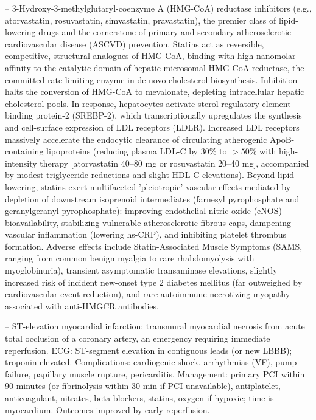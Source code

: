 -- 3-Hydroxy-3-methylglutaryl-coenzyme A (HMG-CoA) reductase inhibitors (e.g., atorvastatin, rosuvastatin, simvastatin, pravastatin), the premier class of lipid-lowering drugs and the cornerstone of primary and secondary atherosclerotic cardiovascular disease (ASCVD) prevention. Statins act as reversible, competitive, structural analogues of HMG-CoA, binding with high nanomolar affinity to the catalytic domain of hepatic microsomal HMG-CoA reductase, the committed rate-limiting enzyme in de novo cholesterol biosynthesis. Inhibition halts the conversion of HMG-CoA to mevalonate, depleting intracellular hepatic cholesterol pools. In response, hepatocytes activate sterol regulatory element-binding protein-2 (SREBP-2), which transcriptionally upregulates the synthesis and cell-surface expression of LDL receptors (LDLR). Increased LDL receptors massively accelerate the endocytic clearance of circulating atherogenic ApoB-containing lipoproteins (reducing plasma LDL-C by 30\% to $>50\%$ with high-intensity therapy [atorvastatin 40--80 mg or rosuvastatin 20--40 mg], accompanied by modest triglyceride reductions and slight HDL-C elevations). Beyond lipid lowering, statins exert multifaceted 'pleiotropic' vascular effects mediated by depletion of downstream isoprenoid intermediates (farnesyl pyrophosphate and geranylgeranyl pyrophosphate): improving endothelial nitric oxide (eNOS) bioavailability, stabilizing vulnerable atherosclerotic fibrous caps, dampening vascular inflammation (lowering hs-CRP), and inhibiting platelet thrombus formation. Adverse effects include Statin-Associated Muscle Symptoms (SAMS, ranging from common benign myalgia to rare rhabdomyolysis with myoglobinuria), transient asymptomatic transaminase elevations, slightly increased risk of incident new-onset type 2 diabetes mellitus (far outweighed by cardiovascular event reduction), and rare autoimmune necrotizing myopathy associated with anti-HMGCR antibodies.

-- ST-elevation myocardial infarction: transmural myocardial necrosis from acute total occlusion of a coronary artery, an emergency requiring immediate reperfusion. ECG: ST-segment elevation in contiguous leads (or new LBBB); troponin elevated. Complications: cardiogenic shock, arrhythmias (VF), pump failure, papillary muscle rupture, pericarditis. Management: primary PCI within 90 minutes (or fibrinolysis within 30 min if PCI unavailable), antiplatelet, anticoagulant, nitrates, beta-blockers, statins, oxygen if hypoxic; time is myocardium. Outcomes improved by early reperfusion.


